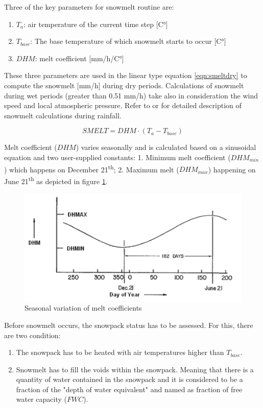 Three of the key parameters for snowmelt routine are:
\begin{enumerate}
    \item $T_a$: air temperature of the current time step [C°]
    \item $T_{base}$: The base temperature of which snowmelt starts to occur [C°]
    \item $DHM$: melt coefficient [mm/h/C°]
\end{enumerate}

These three parameters are used in the linear type equation \ref{eqn:smeltdry} to compute the snowmelt [mm/h] during dry periods. Calculations of snowmelt during wet periods (greater than 0.51 mm/h) take also in consideration the wind speed and local atmospheric pressure. Refer to \citet{anderson1973,anderson2006} or \citet{Rossman2016} for detailed description of snowmelt calculations during rainfall.

\begin{equation}
\label{eqn:smeltdry}
SMELT = DHM \cdot (T_a - T_{base}) 
\end{equation}

Melt coefficient ($DHM$) varies seasonally and is calculated based on a sinusoidal equation and two user-supplied constants: 1. Minimum melt coefficient ($DHM_{min}$) which happens on December 21\textsuperscript{th}; 2. Maximum melt ($DHM_{max}$) happening on June 21\textsuperscript{th} as depicted in figure \ref{fig:meltcoeff}. 

\begin{figure}[h]
    \centering
	\includegraphics[scale=0.55]{figures/snowmelt_DHM.png}
	\caption{Seasonal variation of melt coefficients \cite{Rossman2016}}
	\label{fig:meltcoeff}
\end{figure}

 Before snowmelt occurs, the snowpack status has to be assessed. For this, there are two condition:
 \begin{enumerate}
    \item The snowpack has to be heated with air temperatures higher than $T_{base}$.
    \item Snowmelt has to fill the voids within the snowpack. Meaning that there is a quantity of water contained in the snowpack and it is considered to be a fraction of the "depth of water equivalent" and named as fraction of free water capacity ($FWC$). 
\end{enumerate}
  
